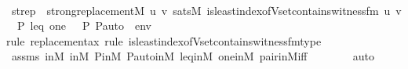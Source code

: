 \begin{isabellebody}
%
\isadelimproof
%
\endisadelimproof
%
\isatagproof
{}\isamarkupfalse%
\ {\isacharminus}{\kern0pt}\isanewline
\ \ \isamarkupfalse%
\ strep\ {\isacharcolon}{\kern0pt}\ {\isachardoublequoteopen}strong{\isacharunderscore}{\kern0pt}replacement{\isacharparenleft}{\kern0pt}{\isacharhash}{\kern0pt}{\isacharhash}{\kern0pt}M{\isacharcomma}{\kern0pt}\ {\isasymlambda}u\ v{\isachardot}{\kern0pt}\ sats{\isacharparenleft}{\kern0pt}M{\isacharcomma}{\kern0pt}\ is{\isacharunderscore}{\kern0pt}least{\isacharunderscore}{\kern0pt}index{\isacharunderscore}{\kern0pt}of{\isacharunderscore}{\kern0pt}Vset{\isacharunderscore}{\kern0pt}contains{\isacharunderscore}{\kern0pt}witness{\isacharunderscore}{\kern0pt}fm{\isacharparenleft}{\kern0pt}{\isasymphi}{\isacharparenright}{\kern0pt}{\isacharcomma}{\kern0pt}\ {\isacharbrackleft}{\kern0pt}u{\isacharcomma}{\kern0pt}\ v{\isacharbrackright}{\kern0pt}\ {\isacharat}{\kern0pt}\ {\isacharbrackleft}{\kern0pt}P{\isacharcomma}{\kern0pt}\ leq{\isacharcomma}{\kern0pt}\ one{\isacharcomma}{\kern0pt}\ {\isacharless}{\kern0pt}{\isasymF}{\isacharcomma}{\kern0pt}\ {\isasymG}{\isacharcomma}{\kern0pt}\ P{\isacharcomma}{\kern0pt}\ P{\isacharunderscore}{\kern0pt}auto{\isachargreater}{\kern0pt}{\isacharbrackright}{\kern0pt}\ {\isacharat}{\kern0pt}\ env{\isacharparenright}{\kern0pt}{\isacharparenright}{\kern0pt}{\isachardoublequoteclose}\ \isanewline
\ \ \ \ \isamarkupfalse%
{\isacharparenleft}{\kern0pt}rule\ replacement{\isacharunderscore}{\kern0pt}ax{\isacharcomma}{\kern0pt}\ rule\ is{\isacharunderscore}{\kern0pt}least{\isacharunderscore}{\kern0pt}index{\isacharunderscore}{\kern0pt}of{\isacharunderscore}{\kern0pt}Vset{\isacharunderscore}{\kern0pt}contains{\isacharunderscore}{\kern0pt}witness{\isacharunderscore}{\kern0pt}fm{\isacharunderscore}{\kern0pt}type{\isacharparenright}{\kern0pt}\isanewline
\ \ \ \ \isamarkupfalse%
\ assms\ {\isasymF}{\isacharunderscore}{\kern0pt}in{\isacharunderscore}{\kern0pt}M\ {\isasymG}{\isacharunderscore}{\kern0pt}in{\isacharunderscore}{\kern0pt}M\ P{\isacharunderscore}{\kern0pt}in{\isacharunderscore}{\kern0pt}M\ P{\isacharunderscore}{\kern0pt}auto{\isacharunderscore}{\kern0pt}in{\isacharunderscore}{\kern0pt}M\ leq{\isacharunderscore}{\kern0pt}in{\isacharunderscore}{\kern0pt}M\ one{\isacharunderscore}{\kern0pt}in{\isacharunderscore}{\kern0pt}M\ pair{\isacharunderscore}{\kern0pt}in{\isacharunderscore}{\kern0pt}M{\isacharunderscore}{\kern0pt}iff\isanewline
\ \ \ \ \ \ \isamarkupfalse%
\ auto{\isacharbrackleft}{\kern0pt}{}{\isacharbrackright}{\kern0pt}\isanewline

\end{isabellebody}
